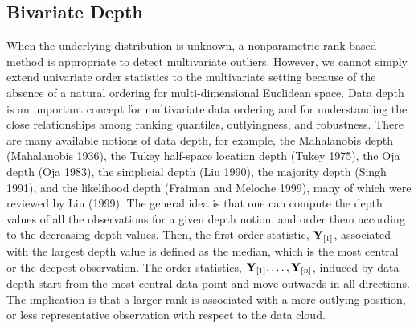 \documentclass[12pt]{article}
\def\bY{{\bf Y}}
\def\bY{{\bf Y}}
\begin{document}
\begin{doublespacing}
\subsection{Bivariate Depth}\label{subsec:dp}

 When the underlying distribution is unknown, a nonparametric rank-based method is appropriate to detect multivariate outliers.
 However,  we cannot simply extend univariate order statistics to the multivariate setting because of the absence of a natural ordering for multi-dimensional Euclidean space. Data depth is an important concept for multivariate data ordering and for understanding the close relationships among ranking quantiles, outlyingness, and robustness. There are many available notions of data depth, for example, the Mahalanobis depth (Mahalanobis 1936), the Tukey half-space location depth (Tukey 1975), the Oja depth (Oja 1983), the simplicial depth (Liu 1990), the majority depth (Singh 1991), and the likelihood depth (Fraiman and Meloche 1999), many of which were reviewed by Liu (1999). The general idea is that one can compute the depth values of all the observations for a given depth notion, and order them according to the decreasing depth values. Then, the first order statistic, $\bY_{[1]}$, associated with the largest depth value is defined as the median, which is the most central or the deepest observation.  The order statistics, $\bY_{[1]},\ldots ,\bY_{[n]}$, induced by data depth start from the most central data point and move outwards in all directions. The implication is that a larger rank is associated with a more outlying position, or less representative observation with respect to the data cloud.


\end{doublespacing}
\end{document}

